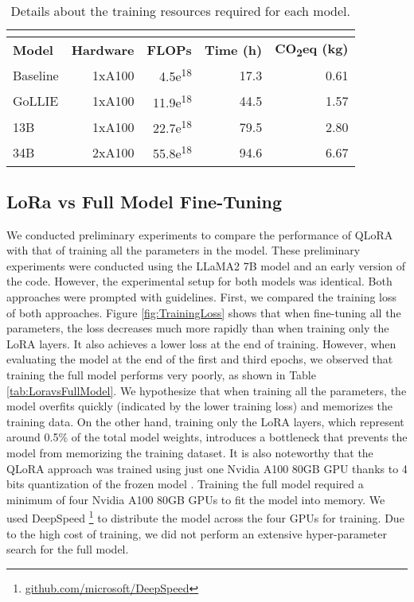 \documentclass{article} \usepackage{iclr2024_conference,times}
\newcommand{\GoLLIE}{\scalerel*{\texttt{[image: logo/GoLLIE.pdf]}}{\textrm{\textbigcircle}} }
\newcommand{\GoLLIET}{\scalerel*{\texttt{[image: logo/GoLLIE.pdf]}}{\textrm{\textbigcircle}} GoLLIE}
\begin{document}
\begin{table}[htb]
    \centering
    \caption{Details about the training resources required for each model.}
    \begin{tabular}{l|rrrr}
        \multicolumn{5}{c}{} \\
        \toprule
         \textbf{Model} & \textbf{Hardware} & \textbf{FLOPs} & \textbf{Time (h)} & \textbf{CO\textsubscript{2}eq (kg)} \\
        \midrule
         Baseline & 1xA100 & 4.5e\textsuperscript{18} & 17.3 & 0.61 \\
        \GoLLIET & 1xA100 & 11.9e\textsuperscript{18} & 44.5 & 1.57 \\
        \GoLLIE 13B & 1xA100 & 22.7e\textsuperscript{18} & 79.5 & 2.80 \\
        \GoLLIE 34B & 2xA100 & 55.8e\textsuperscript{18} & 94.6 & 6.67 \\
        \bottomrule
    \end{tabular}
    
    \label{tab:train_extended_details}
\end{table}

\subsection{LoRa vs Full Model Fine-Tuning}
\label{ap:lora_full_model_finetuning}
We conducted preliminary experiments to compare the performance of QLoRA \citep{lora, qlora} with that of training all the parameters in the model. These preliminary experiments were conducted using the LLaMA2 7B model \cite{DBLP:journals/corr/abs-2307-09288} and an early version of the code. However, the experimental setup for both models was identical. Both approaches were prompted with guidelines. First, we compared the training loss of both approaches. Figure \ref{fig:TrainingLoss} shows that when fine-tuning all the parameters, the loss decreases much more rapidly than when training only the LoRA layers. It also achieves a lower loss at the end of training. However, when evaluating the model at the end of the first and third epochs, we observed that training the full model performs very poorly, as shown in Table \ref{tab:LoravsFullModel}. We hypothesize that when training all the parameters, the model overfits quickly (indicated by the lower training loss) and memorizes the training data. On the other hand, training only the LoRA layers, which represent around 0.5\% of the total model weights, introduces a bottleneck that prevents the model from memorizing the training dataset. It is also noteworthy that the QLoRA approach was trained using just one Nvidia A100 80GB GPU thanks to 4 bits quantization of the frozen model \cite{qlora}. Training the full model required a minimum of four Nvidia A100 80GB GPUs to fit the model into memory. We used DeepSpeed \footnote{\url{github.com/microsoft/DeepSpeed}} to distribute the model across the four GPUs for training. Due to the high cost of training, we did not perform an extensive hyper-parameter search for the full model.
\end{document}
